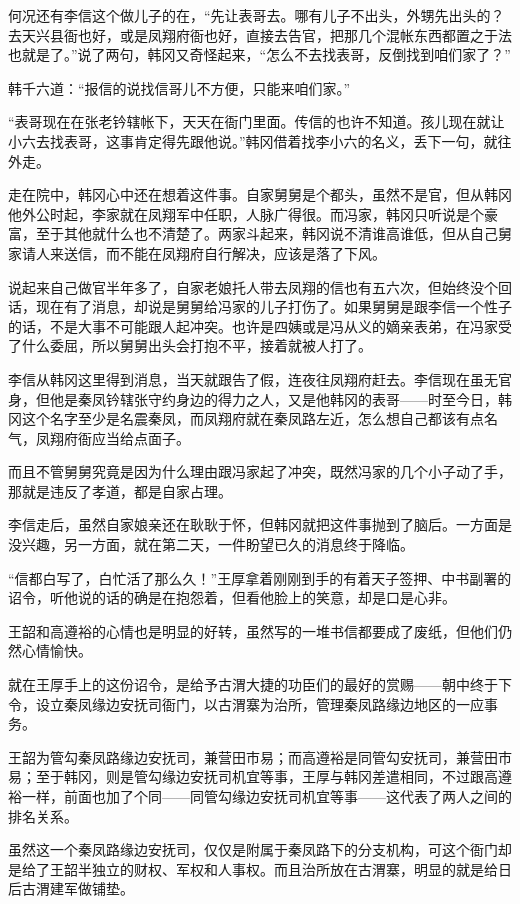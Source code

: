 何况还有李信这个做儿子的在，“先让表哥去。哪有儿子不出头，外甥先出头的？去天兴县衙也好，或是凤翔府衙也好，直接去告官，把那几个混帐东西都置之于法也就是了。”说了两句，韩冈又奇怪起来，“怎么不去找表哥，反倒找到咱们家了？”

韩千六道：“报信的说找信哥儿不方便，只能来咱们家。”

“表哥现在在张老钤辖帐下，天天在衙门里面。传信的也许不知道。孩儿现在就让小六去找表哥，这事肯定得先跟他说。”韩冈借着找李小六的名义，丢下一句，就往外走。

走在院中，韩冈心中还在想着这件事。自家舅舅是个都头，虽然不是官，但从韩冈他外公时起，李家就在凤翔军中任职，人脉广得很。而冯家，韩冈只听说是个豪富，至于其他就什么也不清楚了。两家斗起来，韩冈说不清谁高谁低，但从自己舅家请人来送信，而不能在凤翔府自行解决，应该是落了下风。

说起来自己做官半年多了，自家老娘托人带去凤翔的信也有五六次，但始终没个回话，现在有了消息，却说是舅舅给冯家的儿子打伤了。如果舅舅是跟李信一个性子的话，不是大事不可能跟人起冲突。也许是四姨或是冯从义的嫡亲表弟，在冯家受了什么委屈，所以舅舅出头会打抱不平，接着就被人打了。

李信从韩冈这里得到消息，当天就跟告了假，连夜往凤翔府赶去。李信现在虽无官身，但他是秦凤钤辖张守约身边的得力之人，又是他韩冈的表哥——时至今日，韩冈这个名字至少是名震秦凤，而凤翔府就在秦凤路左近，怎么想自己都该有点名气，凤翔府衙应当给点面子。

而且不管舅舅究竟是因为什么理由跟冯家起了冲突，既然冯家的几个小子动了手，那就是违反了孝道，都是自家占理。

李信走后，虽然自家娘亲还在耿耿于怀，但韩冈就把这件事抛到了脑后。一方面是没兴趣，另一方面，就在第二天，一件盼望已久的消息终于降临。

“信都白写了，白忙活了那么久！”王厚拿着刚刚到手的有着天子签押、中书副署的诏令，听他说的话的确是在抱怨着，但看他脸上的笑意，却是口是心非。

王韶和高遵裕的心情也是明显的好转，虽然写的一堆书信都要成了废纸，但他们仍然心情愉快。

就在王厚手上的这份诏令，是给予古渭大捷的功臣们的最好的赏赐——朝中终于下令，设立秦凤缘边安抚司衙门，以古渭寨为治所，管理秦凤路缘边地区的一应事务。

王韶为管勾秦凤路缘边安抚司，兼营田市易；而高遵裕是同管勾安抚司，兼营田市易；至于韩冈，则是管勾缘边安抚司机宜等事，王厚与韩冈差遣相同，不过跟高遵裕一样，前面也加了个同——同管勾缘边安抚司机宜等事——这代表了两人之间的排名关系。

虽然这一个秦凤路缘边安抚司，仅仅是附属于秦凤路下的分支机构，可这个衙门却是给了王韶半独立的财权、军权和人事权。而且治所放在古渭寨，明显的就是给日后古渭建军做铺垫。

